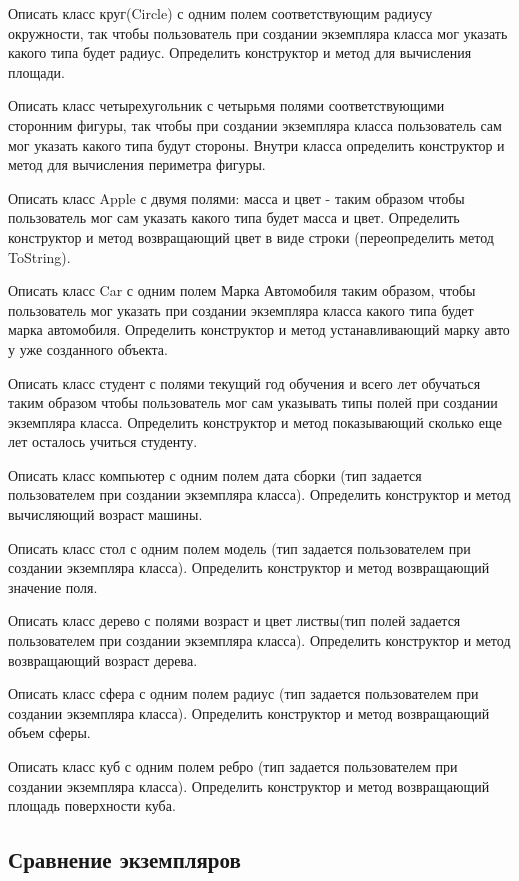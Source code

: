 \task Описать класс круг(Circle) с одним полем соответствующим радиусу
окружности, так чтобы пользователь при создании экземпляра класса мог
указать какого типа будет радиус. Определить конструктор и метод для
вычисления площади.

\task Описать класс четырехугольник с четырьмя полями соответствующими
сторонним фигуры, так чтобы при создании экземпляра класса
пользователь сам мог указать какого типа будут стороны. Внутри класса
определить конструктор и метод для вычисления периметра фигуры.

\task Описать класс Apple с двумя полями: масса и цвет - таким образом
чтобы пользователь мог сам указать какого типа будет масса и
цвет. Определить конструктор и метод возвращающий цвет в виде строки
(переопределить метод ToString).

\task Описать класс Car с одним полем Марка Автомобиля таким образом,
чтобы пользователь мог указать при создании экземпляра класса какого
типа будет марка автомобиля. Определить конструктор и метод
устанавливающий марку авто у уже созданного объекта.

\task Описать класс студент с полями текущий год обучения и всего лет
обучаться таким образом чтобы пользователь мог сам указывать типы
полей при создании экземпляра класса. Определить конструктор и метод
показывающий сколько еще лет осталось учиться студенту.

\task Описать класс компьютер с одним полем дата сборки (тип задается
пользователем при создании экземпляра класса). Определить конструктор
и метод вычисляющий возраст машины.

\task Описать класс стол с одним полем модель (тип задается
пользователем при создании экземпляра класса). Определить конструктор
и метод возвращающий значение поля.

\task Описать класс дерево с полями возраст и цвет листвы(тип полей
задается пользователем при создании экземпляра класса). Определить
конструктор и метод возвращающий возраст дерева.

\task Описать класс сфера с одним полем радиус (тип задается
пользователем при создании экземпляра класса). Определить конструктор
и метод возвращающий объем сферы.

\task Описать класс куб с одним полем ребро (тип задается
пользователем при создании экземпляра класса). Определить конструктор
и метод возвращающий площадь поверхности куба.

\subsection{Сравнение экземпляров}

